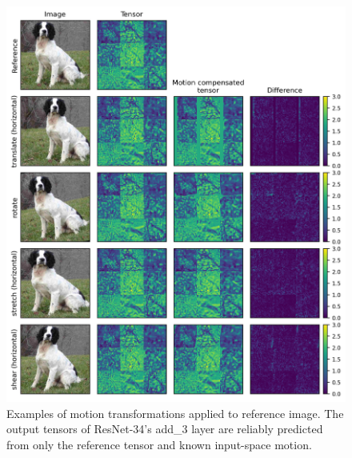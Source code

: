 \begin{figure}[htbp]
    \centering
    \includegraphics[width=0.95\linewidth]{img/video_latent_space_motion_analysis/examples.png}
    \caption{%
        Examples of motion transformations applied to reference image.
        The output tensors of ResNet-34's add\_3 layer are reliably predicted from only the reference tensor and known input-space motion. %
    }
    \label{fig:video_latent_space_motion_analysis/examples}
\end{figure}






